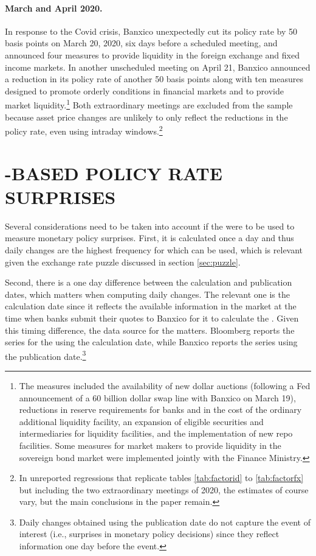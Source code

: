 \documentclass[a4paper,12pt]{article} 		%
\begin{document}
\begin{appendices}
\paragraph{March and April 2020.} In response to the Covid crisis, Banxico unexpectedly cut its policy rate by 50 basis points on March 20, 2020, six days before a scheduled meeting, and announced four measures to provide liquidity in the foreign exchange and fixed income markets. In another unscheduled meeting on April 21, Banxico announced a reduction in its policy rate of another 50 basis points along with ten measures designed to promote orderly conditions in financial markets and to provide market liquidity.\footnote{The measures included the availability of new dollar auctions (following a Fed announcement of a 60 billion dollar swap line with Banxico on March 19), reductions in reserve requirements for banks and in the cost of the ordinary additional liquidity facility, an expansion of eligible securities and intermediaries for liquidity facilities, and the implementation of new repo facilities. Some measures for market makers to provide liquidity in the sovereign bond market were implemented jointly with the Finance Ministry.} Both extraordinary meetings are excluded from the sample because asset price changes are unlikely to only reflect the reductions in the policy rate, even using intraday windows.\footnote{In unreported regressions that replicate tables \ref{tab:factorid} to \ref{tab:factorfx} but including the two extraordinary meetings of 2020, the estimates of course vary, but the main conclusions in the paper remain.} 

\sectitlespace
\section{\tiie{}-BASED POLICY RATE SURPRISES} \label{sec:tiie}
\sectitlespace

Several considerations need to be taken into account if the \tiie{} were to be used to measure monetary policy surprises. First, it is calculated once a day and thus daily changes are the highest frequency for which \tiie{} can be used, which is relevant given the exchange rate puzzle discussed in section \ref{sec:puzzle}. 

Second, there is a one day difference between the calculation and publication dates, which matters when computing daily changes. The relevant one is the calculation date since it reflects the available information in the market at the time when banks submit their quotes to Banxico for it to calculate the \tiie. Given this timing difference, the data source for the \tiie{} matters. Bloomberg reports the series for the \tiie{} using the calculation date, while Banxico reports the series using the publication date.\footnote{ Daily changes obtained using the publication date do not capture the event of interest (i.e., surprises in monetary policy decisions) since they reflect information one day before the event.}


\end{appendices}
\end{document}
